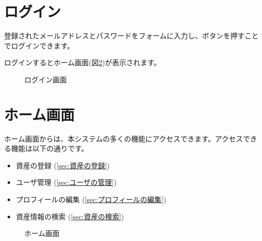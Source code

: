 \documentclass[11ptm]{jsarticle}
\begin{document}
\section{ログイン}
\label{sec:ログイン}
登録されたメールアドレスとパスワードをフォームに入力し、ボタンを押すことでログインできます。\par
ログインするとホーム画面(図\ref{fig:ホーム画面})が表示されます。
\begin{figure}[h]
  \centering
  \caption{\label{fig:ログイン画面}ログイン画面}
\end{figure}


\section{ホーム画面}
\label{sec:ホーム画面}
ホーム画面からは、本システムの多くの機能にアクセスできます。アクセスできる機能は以下の通りです。
\begin{itemize}
  \item 資産の登録 (\!\ref{sec:資産の登録})
  \item ユーザ管理 (\!\ref{sec:ユーザの管理})
  \item プロフィールの編集 (\!\ref{sec:プロフィールの編集})
  \item 資産情報の検索 (\!\ref{sec:資産の検索})
\end{itemize}\par
\begin{figure}[h]
  \centering
  \caption{\label{fig:ホーム画面}ホーム画面}
\end{figure}
\end{document}
